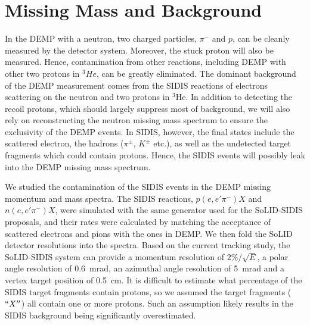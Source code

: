 \section{Missing Mass and Background}

In the DEMP with a neutron, two charged particles, $\pi^{-}$ and $p$, can be cleanly measured by the detector system. 
Moreover, the stuck proton will also be measured. 
Hence, contamination from other reactions, including DEMP with other two protons in $^{3}He$, can be greatly eliminated.
The dominant background of the DEMP measurement comes from the SIDIS reactions
of electrons scattering on the neutron and two protons in $\mathrm{^{3}He}$. In
addition to detecting the recoil protons, which should largely suppress most of
background, we will also rely on reconstructing the neutron missing mass
spectrum to ensure the exclusivity of the DEMP events. In SIDIS, however, the
final states include the scattered electron, the hadrons ($\pi^{\pm}$,
$K^{\pm}$ etc.), as well as the undetected target fragments which could contain
protons. Hence, the SIDIS events will possibly leak into the DEMP missing mass
spectrum.

We studied the contamination of the SIDIS events in the DEMP missing momentum
and mass spectra. The SIDIS reactions, $p(e,e'\pi^{-})X$ and $n(e,e'\pi^{-})X$,
were simulated with the same generator used for the SoLID-SIDIS proposals, and
their rates were calculated by matching the acceptance of scattered electrons
and pions with the ones in DEMP. We then fold the SoLID detector resolutions
into the spectra. Based on the current tracking study, the SoLID-SIDIS system
can provide a momentum resolution of $2\%/\sqrt{E}$, a polar angle
resolution of 0.6~mrad, an azimuthal angle resolution of 5~mrad and a
vertex target position of 0.5~cm. It is difficult to estimate what
percentage of the SIDIS target fragments contain protons, so we assumed
the target fragments ($``X''$) all contain one or more protons. Such an
assumption likely results in the SIDIS background being significantly
overestimated.

